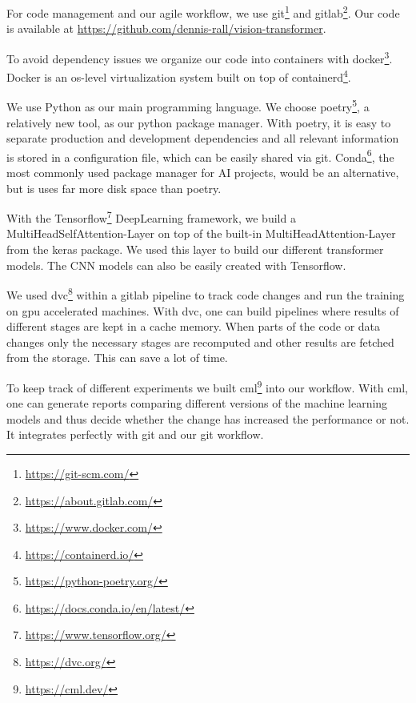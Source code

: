 \documentclass[a4paper]{scrartcl}
\begin{document}
    For code management and our agile workflow, we use git\footnote{\href{https://git-scm.com/}{https://git-scm.com/}} and gitlab\footnote{\href{https://about.gitlab.com/}{https://about.gitlab.com/}}.
    Our code is available at \href{https://github.com/dennis-rall/vision-transformer}{https://github.com/dennis-rall/vision-transformer}.

    To avoid dependency issues we organize our code into containers with docker\footnote{\href{https://www.docker.com/}{https://www.docker.com/}}.
    Docker is an os-level virtualization system built on top of containerd\footnote{\href{https://containerd.io/}{https://containerd.io/}}.

    We use Python as our main programming language.
    We choose poetry\footnote{\href{https://python-poetry.org/}{https://python-poetry.org/}}, a relatively new tool, as our python package manager.
    With poetry, it is easy to separate production and development dependencies and all relevant information is stored in a configuration file, which can be easily shared via git.
    Conda\footnote{\href{https://docs.conda.io/en/latest/}{https://docs.conda.io/en/latest/}}, the most commonly used package manager for AI projects, would be an alternative, but is uses far more disk space than poetry.

    With the Tensorflow\footnote{\href{https://www.tensorflow.org/}{https://www.tensorflow.org/}} DeepLearning framework, we build a MultiHeadSelfAttention-Layer on top of the built-in MultiHeadAttention-Layer from the keras package.
    We used this layer to build our different transformer models.
    The CNN models can also be easily created with Tensorflow.

    We used dvc\footnote{\href{https://dvc.org/}{https://dvc.org/}} within a gitlab pipeline to track code changes and run the training on gpu accelerated machines.
    With dvc, one can build pipelines where results of different stages are kept in a cache memory.
    When parts of the code or data changes only the necessary stages are recomputed and other results are fetched from the storage.
    This can save a lot of time.

    To keep track of different experiments we built cml\footnote{\href{https://cml.dev/}{https://cml.dev/}} into our workflow.
    With cml, one can generate reports comparing different versions of the machine learning models and thus decide whether the change has increased the performance or not.
    It integrates perfectly with git and our git workflow.


    \pagebreak

    {
        
    }
\end{document}
